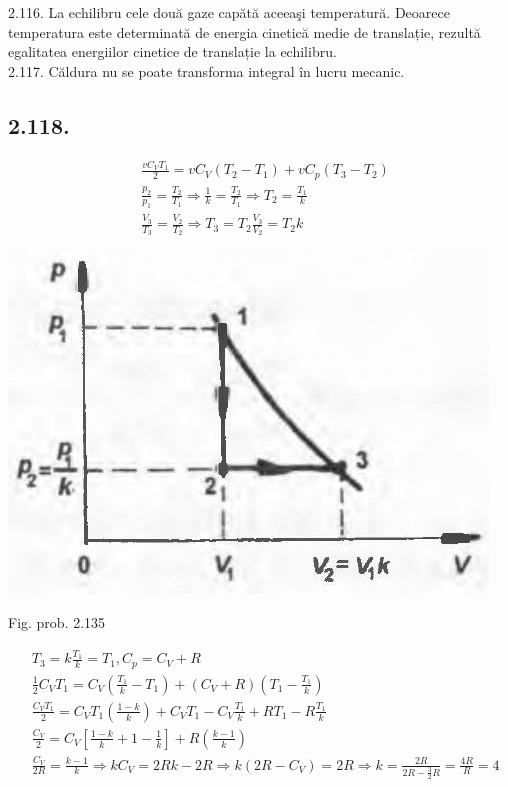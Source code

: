 \documentclass[10pt]{article}
\begin{document}
2.116. La echilibru cele două gaze capătă aceeaşi temperatură. Deoarece temperatura este determinată de energia cinetică medie de translație, rezultă egalitatea energiilor cinetice de translație la echilibru.\\
2.117. Căldura nu se poate transforma integral în lucru mecanic.

\subsection*{2.118.}
$$
\begin{aligned}
& \frac{v C_{V} T_{1}}{2}=v C_{V}\left(T_{2}-T_{1}\right)+v C_{p}\left(T_{3}-T_{2}\right) \\
& \frac{p_{2}}{p_{1}}=\frac{T_{2}}{T_{1}} \Rightarrow \frac{1}{k}=\frac{T_{2}}{T_{1}} \Rightarrow T_{2}=\frac{T_{1}}{k} \\
& \frac{V_{3}}{T_{3}}=\frac{V_{2}}{T_{2}} \Rightarrow T_{3}=T_{2} \frac{V_{3}}{V_{2}}=T_{2} k
\end{aligned}
$$

\begin{center}
\includegraphics[max width=\textwidth]{2025_07_01_5b3ff9fa0d508c8e9f17g-293}
\end{center}

Fig. prob. 2.135

$$
\begin{aligned}
& T_{3}=k \frac{T_{1}}{k}=T_{1}, C_{p}=C_{V}+R \\
& \frac{1}{2} C_{V} T_{1}=C_{V}\left(\frac{T_{1}}{k}-T_{1}\right)+\left(C_{V}+R\right)\left(T_{1}-\frac{T_{1}}{k}\right) \\
& \frac{C_{V} T_{1}}{2}=C_{V} T_{1}\left(\frac{1-k}{k}\right)+C_{V} T_{1}-C_{V} \frac{T_{1}}{k}+R T_{1}-R \frac{T_{1}}{k} \\
& \frac{C_{V}}{2}=C_{V}\left[\frac{1-k}{k}+1-\frac{1}{k}\right]+R\left(\frac{k-1}{k}\right) \\
& \frac{C_{V}}{2 R}=\frac{k-1}{k} \Rightarrow k C_{V}=2 R k-2 R \Rightarrow k\left(2 R-C_{V}\right)=2 R \Rightarrow k=\frac{2 R}{2 R-\frac{3}{2} R}=\frac{4 R}{R}=4
\end{aligned}
$$
\end{document}
